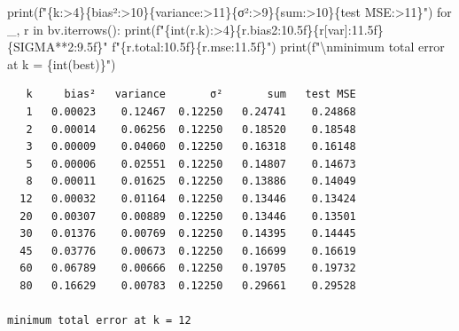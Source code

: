 \documentclass[
  letterpaper,
  10pt,
  twoside,
  openright,
  numbers=noenddot,
  chapterprefix=true]{scrbook}
\newenvironment{Shaded}{}{}
\newcommand{\BuiltInTok}[1]{\textcolor[rgb]{0.84,0.23,0.29}{#1}}
\newcommand{\CharTok}[1]{\textcolor[rgb]{0.01,0.18,0.38}{#1}}
\newcommand{\ControlFlowTok}[1]{\textcolor[rgb]{0.84,0.23,0.29}{#1}}
\newcommand{\DecValTok}[1]{\textcolor[rgb]{0.00,0.36,0.77}{#1}}
\newcommand{\KeywordTok}[1]{\textcolor[rgb]{0.84,0.23,0.29}{#1}}
\newcommand{\NormalTok}[1]{\textcolor[rgb]{0.14,0.16,0.18}{#1}}
\newcommand{\OperatorTok}[1]{\textcolor[rgb]{0.14,0.16,0.18}{#1}}
\newcommand{\SpecialCharTok}[1]{\textcolor[rgb]{0.00,0.36,0.77}{#1}}
\newcommand{\SpecialStringTok}[1]{\textcolor[rgb]{0.01,0.18,0.38}{#1}}
\newcommand{\StringTok}[1]{\textcolor[rgb]{0.01,0.18,0.38}{#1}}
\begin{document}
\begin{Shaded}
\begin{Highlighting}[]
\BuiltInTok{print}\NormalTok{(}\SpecialStringTok{f"}\SpecialCharTok{\{}\StringTok{\textquotesingle{}k\textquotesingle{}}\SpecialCharTok{:\textgreater{}4\}\{}\StringTok{\textquotesingle{}bias²\textquotesingle{}}\SpecialCharTok{:\textgreater{}10\}\{}\StringTok{\textquotesingle{}variance\textquotesingle{}}\SpecialCharTok{:\textgreater{}11\}\{}\StringTok{\textquotesingle{}σ²\textquotesingle{}}\SpecialCharTok{:\textgreater{}9\}\{}\StringTok{\textquotesingle{}sum\textquotesingle{}}\SpecialCharTok{:\textgreater{}10\}\{}\StringTok{\textquotesingle{}test MSE\textquotesingle{}}\SpecialCharTok{:\textgreater{}11\}}\SpecialStringTok{"}\NormalTok{)}
\ControlFlowTok{for}\NormalTok{ \_, r }\KeywordTok{in}\NormalTok{ bv.iterrows():}
    \BuiltInTok{print}\NormalTok{(}\SpecialStringTok{f"}\SpecialCharTok{\{}\BuiltInTok{int}\NormalTok{(r.k)}\SpecialCharTok{:\textgreater{}4\}\{}\NormalTok{r}\SpecialCharTok{.}\NormalTok{bias2}\SpecialCharTok{:10.5f\}\{}\NormalTok{r[}\StringTok{\textquotesingle{}var\textquotesingle{}}\NormalTok{]}\SpecialCharTok{:11.5f\}\{}\NormalTok{SIGMA}\OperatorTok{**}\DecValTok{2}\SpecialCharTok{:9.5f\}}\SpecialStringTok{"}
          \SpecialStringTok{f"}\SpecialCharTok{\{}\NormalTok{r}\SpecialCharTok{.}\NormalTok{total}\SpecialCharTok{:10.5f\}\{}\NormalTok{r}\SpecialCharTok{.}\NormalTok{mse}\SpecialCharTok{:11.5f\}}\SpecialStringTok{"}\NormalTok{)}
\BuiltInTok{print}\NormalTok{(}\SpecialStringTok{f"}\CharTok{\textbackslash{}n}\SpecialStringTok{minimum total error at k = }\SpecialCharTok{\{}\BuiltInTok{int}\NormalTok{(best)}\SpecialCharTok{\}}\SpecialStringTok{"}\NormalTok{)}
\end{Highlighting}
\end{Shaded}

\begin{verbatim}
   k     bias²   variance       σ²       sum   test MSE
   1   0.00023    0.12467  0.12250   0.24741    0.24868
   2   0.00014    0.06256  0.12250   0.18520    0.18548
   3   0.00009    0.04060  0.12250   0.16318    0.16148
   5   0.00006    0.02551  0.12250   0.14807    0.14673
   8   0.00011    0.01625  0.12250   0.13886    0.14049
  12   0.00032    0.01164  0.12250   0.13446    0.13424
  20   0.00307    0.00889  0.12250   0.13446    0.13501
  30   0.01376    0.00769  0.12250   0.14395    0.14445
  45   0.03776    0.00673  0.12250   0.16699    0.16619
  60   0.06789    0.00666  0.12250   0.19705    0.19732
  80   0.16629    0.00783  0.12250   0.29661    0.29528

minimum total error at k = 12
\end{verbatim}
\end{document}
